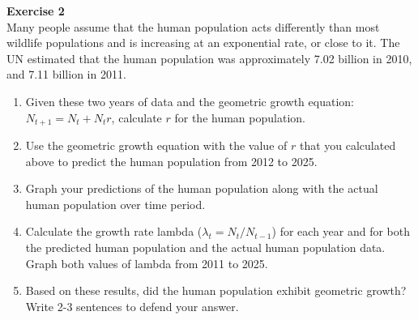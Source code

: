 \documentclass[12pt]{article}\usepackage[]{graphicx}\usepackage[]{xcolor}
\begin{document}








{\bf Exercise 2 \\}
Many people assume that the human population acts differently than
most wildlife populations and is increasing at an exponential rate, or
close to it. The UN estimated that the human population was
approximately 7.02 billion in 2010, and 7.11 billion in 2011.


\begin{enumerate}
  \item Given these two years of data and the geometric growth equation:
    $N_{t+1} = N_t + N_t r$, calculate $r$ for the human population. 
  \item Use the geometric growth equation with the value of $r$ that
    you calculated above to predict the human population from 2012 to
    2025. 
  \item Graph your predictions of the human population along with the
    actual human population over time period.
  \item Calculate the growth rate lambda ($\lambda_t = N_t / N_{t-1}$)
    for each year and for both the predicted human population and the
    actual human population data. Graph both values of lambda from
    2011 to 2025.
  \item Based on these results, did the human population exhibit
    geometric growth? Write 2-3 sentences to defend your answer. 
\end{enumerate}
\end{document}
